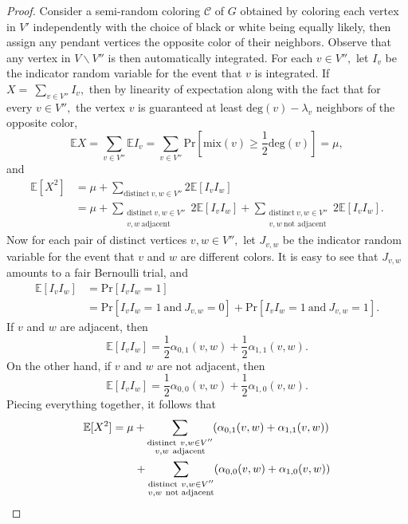\documentclass[11pt, reqno]{amsart}
\theoremstyle{definition}
\renewcommand{\geq}{\geqslant}
\begin{document}
\begin{proof}
Consider a semi-random coloring $\mathcal{C}$ of $G$ obtained by coloring each vertex in $V'$ independently with the choice of black or white being equally likely, then assign any pendant vertices the opposite color of their neighbors. Observe that any vertex in $V\backslash V''$ is then automatically integrated. For each $v \in V'',$ let $I_v$ be the indicator random variable for the event that $v$ is integrated. If $X =\ \sum_{v \in V''} I_v,$ then by linearity of expectation along with the fact that for every $v \in V'',$ the vertex $v$ is guaranteed at least $\text{deg}(v) - \lambda_v$ neighbors of the opposite color,
\begin{equation}
\mathbb{E}X = \sum_{v \in V''} \mathbb{E}I_v = \sum_{v \in V''} \text{Pr}\!\left[\text{mix}(v) \geq \frac{1}{2}\text{deg}(v)\right] = \mu,
\end{equation}
and
\begin{align}
\mathbb{E}[X^2] &= \mu + \sum_{\text{distinct}\ v, w\in V''} 2\mathbb{E}[I_vI_w]
\\ &= \mu + \sum_{\substack{\text{distinct}\ v, w \in V'' \\ v,w\ \text{adjacent}}} 2\mathbb{E}[I_vI_w] + \sum_{\substack{\text{distinct}\ v, w \in V'' \\ v,w\ \text{not adjacent}}} 2\mathbb{E}[I_vI_w].
\end{align}
Now for each pair of distinct vertices $v, w \in V'',$ let $J_{v,w}$ be the indicator random variable for the event that $v$ and $w$ are different colors. It is easy to see that $J_{v,w}$ amounts to a fair Bernoulli trial, and
\begin{align}
\mathbb{E}[I_vI_w] &= \text{Pr}[I_vI_w = 1]
\\ &= \text{Pr}[I_vI_w = 1\ \text{and}\ J_{v,w}=0] + \text{Pr}[I_vI_w = 1\ \text{and}\ J_{v,w}=1].
\end{align}
If $v$ and $w$ are adjacent, then
\[\mathbb{E}[I_vI_w] = \frac{1}{2}\alpha_{0,1}(v,w) + \frac{1}{2}\alpha_{1,1}(v,w).\]
On the other hand, if $v$ and $w$ are not adjacent, then
\[\mathbb{E}[I_vI_w] = \frac{1}{2}\alpha_{0,0}(v,w) + \frac{1}{2}\alpha_{1,0}(v,w).\]
Piecing everything together, it follows that
\begin{align}
\mathbb{E}[X^2] &= \mu + \sum_{\substack{\textup{distinct}\ v, w \in V'' \\ v,w\ \textup{adjacent}}}(\alpha_{0,1}(v,w) + \alpha_{1,1}(v,w)) \nonumber
\\ & \hspace{2em}+ \sum_{\substack{\textup{distinct}\ v, w \in V'' \\ v,w\ \textup{not adjacent}}} (\alpha_{0,0}(v,w) + \alpha_{1,0}(v,w))

\end{align}
\end{proof}
\end{document}
